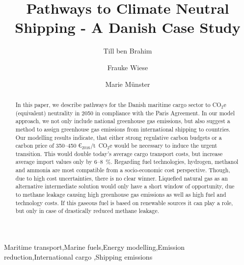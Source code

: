 \documentclass[article]{elsarticle}
\begin{document}
\begin{frontmatter}

\title{Pathways to Climate Neutral Shipping - A Danish Case Study}


\author[label1]{Till ben Brahim}
\address[label1]{Technical University of Denmark, Produktionstorvet 426, 2800 Kongens Lyngby, Denmark}


\author[label1]{Frauke Wiese}

\author[label1]{Marie M\"unster}

\begin{abstract}
In this paper, we describe pathways for the Danish maritime cargo sector to CO$_2$e (equivalent) neutrality in 2050 in compliance with the Paris Agreement. In our model approach, we not only include national greenhouse gas emissions, but also suggest a method to assign greenhouse gas emissions from international shipping to countries.
Our modelling results indicate, that either strong regulative carbon budgets or a carbon price of 350--450 \euro$_{2016}$/t~CO$_2$e would be necessary to induce the urgent transition. This would double today's average cargo transport costs, but increase average import values only by 6--8~\%.
Regarding fuel technologies, hydrogen, methanol and ammonia are most compatible from a socio-economic cost perspective. Though, due to high cost uncertainties, there is no clear winner.
Liquefied natural gas as an alternative intermediate solution would only have a short window of opportunity, due to methane leakage causing high greenhouse gas emissions as well as high fuel and technology costs. If this gaseous fuel is based on renewable sources it can play a role, but only in case of drastically reduced methane leakage.
\end{abstract}

\begin{keyword}
Maritime transport\sep Marine fuels\sep Energy modelling\sep Emission reduction\sep International cargo \sep Shipping emissions
\end{keyword}

\end{frontmatter}
\end{document}
